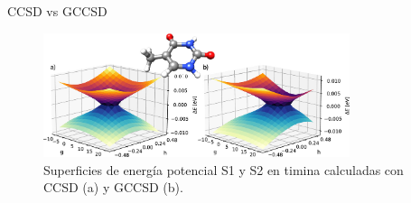 \begin{frame}{CCSD vs GCCSD}
    \begin{figure}
        \includegraphics[width=0.8\textwidth]{images/CCSD.jpeg}
        \caption{Superficies de energía potencial S1 y S2 en timina calculadas con CCSD (a) y GCCSD (b).}
    \end{figure}
\end{frame}
